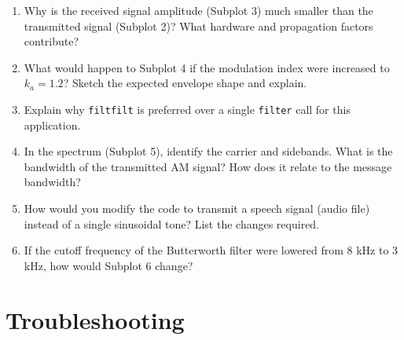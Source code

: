 \documentclass[12pt,a4paper]{article}
\begin{document}
\begin{enumerate}[label=\textbf{Q\arabic*.}, leftmargin=*, itemsep=6pt]

  \item Why is the received signal amplitude (Subplot 3) much smaller than the
        transmitted signal (Subplot 2)?  What hardware and propagation factors
        contribute?

  \item What would happen to Subplot 4 if the modulation index were increased
        to $k_a = 1.2$?  Sketch the expected envelope shape and explain.

  \item Explain why \texttt{filtfilt} is preferred over a single \texttt{filter}
        call for this application.

  \item In the spectrum (Subplot 5), identify the carrier and sidebands.
        What is the bandwidth of the transmitted AM signal?  How does it relate
        to the message bandwidth?

  \item How would you modify the code to transmit a speech signal (audio file)
        instead of a single sinusoidal tone?  List the changes required.

  \item If the cutoff frequency of the Butterworth filter were lowered from
        8 kHz to 3 kHz, how would Subplot 6 change?

\end{enumerate}

\section{Troubleshooting}
\end{document}
